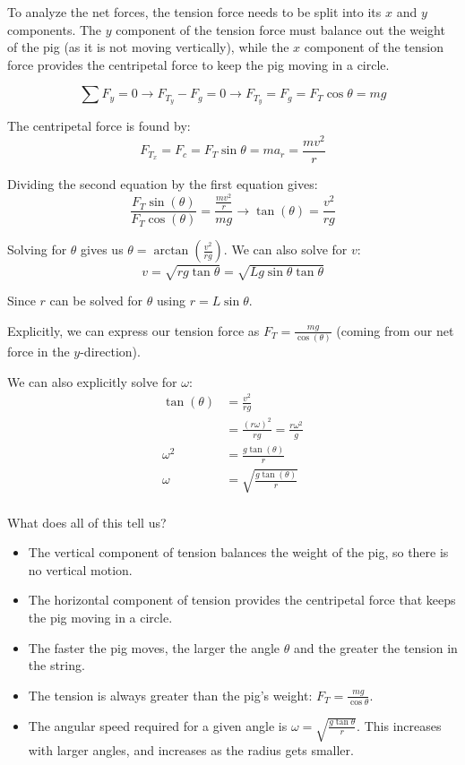 To analyze the net forces, the tension force needs to be split into its $x$ and $y$ components. The $y$ component of the tension force must balance out the weight of the pig (as it is not moving vertically), while the $x$ component of the tension force provides the centripetal force to keep the pig moving in a circle.

\[
  \sum F_y = 0 \to F_{T_y} - F_g = 0 \to F_{T_y} = F_g = F_T \cos{\theta} = mg
\]

The centripetal force is found by:
\[
  F_{T_x} = F_c = F_T \sin{\theta} = ma_r = \frac{mv^2}{r}
\]

Dividing the second equation by the first equation gives:
\[
  \frac{F_T \sin(\theta)}{F_T \cos(\theta)} = \frac{\frac{mv^2}{r}}{mg} \to \tan(\theta) = \frac{v^2}{rg}
\]

Solving for $\theta$ gives us $\theta = \arctan\left(\frac{v^2}{rg}\right)$. We can also solve for $v$:
$$v = \sqrt{r g \tan\theta} = \sqrt{L g \sin\theta \tan\theta}$$

Since $r$ can be solved for $\theta$ using $r = L \sin\theta$.

Explicitly, we can express our tension force as $F_T = \frac{mg}{\cos(\theta)}$ (coming from our net force in the $y$-direction).

We can also explicitly solve for $\omega$:
\begin{align*}
  \tan(\theta) & = \frac{v^2}{rg}                               \\
               & = \frac{(r\omega)^2}{rg} = \frac{r\omega^2}{g} \\
  \omega^2     & =\frac{g\tan(\theta)}{r}                       \\
  \omega       & =\sqrt{\frac{g\tan(\theta)}{r}}                \\
\end{align*}

What does all of this tell us?
\begin{itemize}
  \item The vertical component of tension balances the weight of the pig, so there is no vertical motion.
  \item The horizontal component of tension provides the centripetal force that keeps the pig moving in a circle.
  \item The faster the pig moves, the larger the angle $\theta$ and the greater the tension in the string.
  \item The tension is always greater than the pig's weight: $F_T = \frac{mg}{\cos\theta}$.
  \item The angular speed required for a given angle is $\omega = \sqrt{\frac{g\tan\theta}{r}}$. This increases with larger angles, and increases as the radius gets smaller.
\end{itemize}

